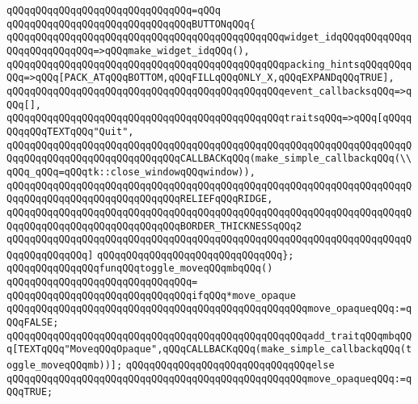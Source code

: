 \verb|qQQqqQQqqQQqqQQqqQQqqQQqqQQqqQQq=qQQq|\newline
\verb|qQQqqQQqqQQqqQQqqQQqqQQqqQQqqQQqBUTTONqQQq{|\newline
\verb|qQQqqQQqqQQqqQQqqQQqqQQqqQQqqQQqqQQqqQQqqQQqqQQqwidget_idqQQqqQQqqQQqqQQqqQQqqQQqqQQq=>qQQqmake_widget_idqQQq(),|\newline
\verb|qQQqqQQqqQQqqQQqqQQqqQQqqQQqqQQqqQQqqQQqqQQqqQQqpacking_hintsqQQqqQQqqQQq=>qQQq[PACK_ATqQQqBOTTOM,qQQqFILLqQQqONLY_X,qQQqEXPANDqQQqTRUE],|\newline
\verb|qQQqqQQqqQQqqQQqqQQqqQQqqQQqqQQqqQQqqQQqqQQqqQQqevent_callbacksqQQq=>qQQq[],|\newline
\newline
\verb|qQQqqQQqqQQqqQQqqQQqqQQqqQQqqQQqqQQqqQQqqQQqqQQqtraitsqQQq=>qQQq[qQQqqQQqqQQqTEXTqQQq"Quit",|\newline
\verb|qQQqqQQqqQQqqQQqqQQqqQQqqQQqqQQqqQQqqQQqqQQqqQQqqQQqqQQqqQQqqQQqqQQqqQQqqQQqqQQqqQQqqQQqqQQqqQQqqQQqCALLBACKqQQq(make_simple_callbackqQQq(\\qQQq_qQQq=qQQqtk::close_windowqQQqwindow)),|\newline
\verb|qQQqqQQqqQQqqQQqqQQqqQQqqQQqqQQqqQQqqQQqqQQqqQQqqQQqqQQqqQQqqQQqqQQqqQQqqQQqqQQqqQQqqQQqqQQqqQQqqQQqRELIEFqQQqRIDGE,|\newline
\verb|qQQqqQQqqQQqqQQqqQQqqQQqqQQqqQQqqQQqqQQqqQQqqQQqqQQqqQQqqQQqqQQqqQQqqQQqqQQqqQQqqQQqqQQqqQQqqQQqqQQqBORDER_THICKNESSqQQq2|\newline
\verb|qQQqqQQqqQQqqQQqqQQqqQQqqQQqqQQqqQQqqQQqqQQqqQQqqQQqqQQqqQQqqQQqqQQqqQQqqQQqqQQqqQQq]|\newline
\verb|qQQqqQQqqQQqqQQqqQQqqQQqqQQqqQQq};|\newline
\newline
\verb|qQQqqQQqqQQqqQQqfunqQQqtoggle_moveqQQqmbqQQq()|\newline
\verb|qQQqqQQqqQQqqQQqqQQqqQQqqQQqqQQq=|\newline
\verb|qQQqqQQqqQQqqQQqqQQqqQQqqQQqqQQqifqQQq*move_opaque|\newline
\newline
\verb|qQQqqQQqqQQqqQQqqQQqqQQqqQQqqQQqqQQqqQQqqQQqqQQqqQQqmove_opaqueqQQq:=qQQqFALSE;|\newline
\verb|qQQqqQQqqQQqqQQqqQQqqQQqqQQqqQQqqQQqqQQqqQQqqQQqqQQqadd_traitqQQqmbqQQq[TEXTqQQq"MoveqQQqOpaque",qQQqCALLBACKqQQq(make_simple_callbackqQQq(toggle_moveqQQqmb))];|\newline
\verb|qQQqqQQqqQQqqQQqqQQqqQQqqQQqqQQqelse|\newline
\verb|qQQqqQQqqQQqqQQqqQQqqQQqqQQqqQQqqQQqqQQqqQQqqQQqqQQqmove_opaqueqQQq:=qQQqTRUE;|\newline
